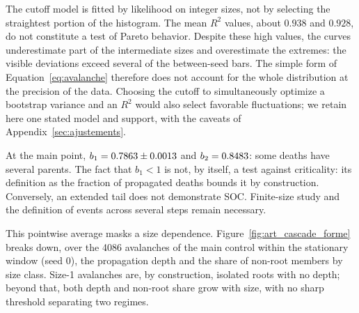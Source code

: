 
The cutoff model is fitted by likelihood on integer sizes, not by
selecting the straightest portion of the histogram. The mean $R^2$
values, about $0.938$ and $0.928$, do not constitute a test of Pareto
behavior. Despite these high values, the curves underestimate part of
the intermediate sizes and overestimate the extremes: the visible
deviations exceed several of the between-seed bars. The simple form of
Equation~\eqref{eq:avalanche} therefore does not account for the whole
distribution at the precision of the data. Choosing the cutoff to
simultaneously optimize a bootstrap variance and an $R^2$ would also
select favorable fluctuations; we retain here one stated model and
support, with the caveats of Appendix~\ref{sec:ajustements}.

At the main point, $b_1=0.7863\pm0.0013$ and
$b_2=0.8483$: some deaths have several parents. The fact that
$b_1<1$ is not, by itself, a test against criticality: its definition
as the fraction of propagated deaths bounds it by construction.
Conversely, an extended tail does not demonstrate SOC. Finite-size
study and the definition of events across several steps remain
necessary.

This pointwise average masks a size dependence. Figure~\ref{fig:art_cascade_forme}
breaks down, over the 4086 avalanches of the main control within the
stationary window (seed 0), the propagation depth and the share of
non-root members by size class. Size-1 avalanches are, by construction,
isolated roots with no depth; beyond that, both depth and non-root
share grow with size, with no sharp threshold separating two regimes.


